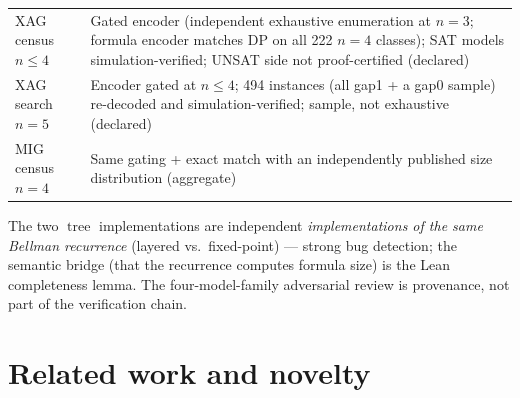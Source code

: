 \documentclass[11pt]{article}
\DeclareMathOperator{\tree}{tree}
\theoremstyle{plain}
\begin{document}
\begin{table}[h]
\begin{tabularx}{\textwidth}{@{}p{}Y@{}}
\addlinespace
XAG census $n \le 4$ &
Gated encoder (independent exhaustive enumeration at $n = 3$; formula encoder matches DP on all 222
$n = 4$ classes); SAT models simulation-verified; UNSAT side not proof-certified (declared) \\
\addlinespace
XAG search $n = 5$ &
Encoder gated at $n \le 4$; 494 instances (all gap1 + a gap0 sample) re-decoded and
simulation-verified; sample, not exhaustive (declared) \\
\addlinespace
MIG census $n = 4$ &
Same gating + exact match with an independently published size distribution (aggregate) \\
\bottomrule
\end{tabularx}
\end{table}

\noindent
The two $\tree$ implementations are independent \emph{implementations of the same Bellman recurrence}
(layered vs.\ fixed-point) --- strong bug detection; the semantic bridge (that the recurrence
computes formula size) is the Lean completeness lemma. The four-model-family adversarial review is
provenance, not part of the verification chain.

\section{Related work and novelty}
\end{document}
